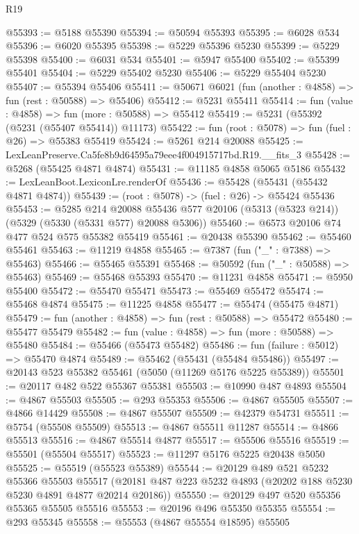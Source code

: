 \begin{lexlean}{R19}
\begin{coremodule}
@55393 := @5188 @55390
@55394 := @50594 @55393
@55395 := @6028 @534
@55396 := @6020 @55395
@55398 := @5229 @55396 @5230
@55399 := @5229 @55398
@55400 := @6031 @534
@55401 := @5947 @55400
@55402 := @55399 @55401
@55404 := @5229 @55402 @5230
@55406 := @5229 @55404 @5230
@55407 := @55394 @55406
@55411 := @50671 @6021 (fun (another : @4858) => fun (rest : @50588) => @55406)
@55412 := @5231 @55411
@55414 := fun (value : @4858) => fun (more : @50588) => @55412
@55419 := @5231 (@55392 (@5231 (@55407 @55414)) @11173)
@55422 := fun (root : @5078) => fun (fuel : @26) => @55383 @55419
@55424 := @5261 @214 @20088
@55425 := LexLeanPreserve.Ca5fe8b9d64595a79eee4f004915717bd.R19.__fits_3
@55428 := @5268 (@55425 @4871 @4874)
@55431 := @11185 @4858 @5065 @5186
@55432 := LexLeanBoot.LexiconLre.renderOf
@55436 := @55428 (@55431 (@55432 @4871 @4874))
@55439 := (root : @5078) -> (fuel : @26) -> @55424 @55436
@55453 := @5285
    @214
    @20088
    @55436
    @577
    @20106
    (@5313 (@5323 @214))
    (@5329 (@5330 (@5331 @577) @20088 @5306))
@55460 := @6573 @20106 @74 @477 @524 @575 @55382 @55419
@55461 := @20438 @55390
@55462 := @55460 @55461
@55463 := @11219 @4858
@55465 := @7387 (fun ("_" : @7388) => @55463)
@55466 := @55465 @55391
@55468 := @50592 (fun ("_" : @50588) => @55463)
@55469 := @55468 @55393
@55470 := @11231 @4858
@55471 := @5950 @55400
@55472 := @55470 @55471
@55473 := @55469 @55472
@55474 := @55468 @4874
@55475 := @11225 @4858
@55477 := @55474 (@55475 @4871)
@55479 := fun (another : @4858) => fun (rest : @50588) => @55472
@55480 := @55477 @55479
@55482 := fun (value : @4858) => fun (more : @50588) => @55480
@55484 := @55466 (@55473 @55482)
@55486 := fun (failure : @5012) => @55470 @4874
@55489 := @55462 (@55431 (@55484 @55486))
@55497 := @20143 @523 @55382 @55461 (@5050 (@11269 @5176 @5225 @55389))
@55501 := @20117 @482 @522 @55367 @55381
@55503 := @10990 @487 @4893
@55504 := @4867 @55503
@55505 := @293 @55353
@55506 := @4867 @55505
@55507 := @4866 @14429
@55508 := @4867 @55507
@55509 := @42379 @54731
@55511 := @5754 (@55508 @55509)
@55513 := @4867 @55511 @11287
@55514 := @4866 @55513
@55516 := @4867 @55514 @4877
@55517 := @55506 @55516
@55519 := @55501 (@55504 @55517)
@55523 := @11297 @5176 @5225 @20438 @5050
@55525 := @55519 (@55523 @55389)
@55544 := @20129
    @489
    @521
    @5232
    @55366
    @55503
    @55517
    (@20181 @487 @223 @5232 @4893 (@20202 @188 @5230 @5230 @4891 @4877 @20214 @20186))
@55550 := @20129 @497 @520 @55356 @55365 @55505 @55516
@55553 := @20196 @496 @55350 @55355
@55554 := @293 @55345
@55558 := @55553 (@4867 @55554 @18595) @55505

\end{coremodule}
\end{lexlean}
